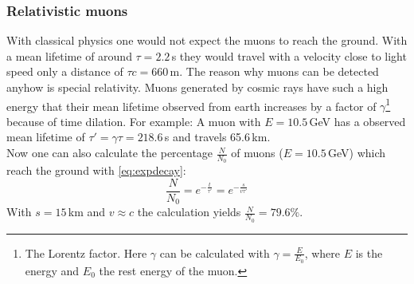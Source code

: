 \subsubsection{Relativistic muons}
With classical physics one would not expect the muons to reach the ground. With a mean lifetime of around $\tau=2.2$\,\textmu s they would 
travel with a velocity close to light speed only a distance of  $\tau c = 660$\,m. The reason why muons can be detected anyhow is special relativity. Muons generated 
by cosmic rays have such a high energy that their mean lifetime observed from earth increases by a factor of 
$\gamma$\footnote{The Lorentz factor. Here $\gamma$ can be calculated with $\gamma = \frac{E}{E_0}$, where $E$ is the energy and $E_0$ the rest energy of the muon.} 
because of time dilation. For example: A muon with $E=10.5$\,GeV has a observed mean lifetime of $\tau'=\gamma \tau=218.6$\,\textmu s and travels 65.6\,km. \\
Now one can also calculate the percentage $\frac{N}{N_0}$ of muons ($E=10.5$\,GeV) which reach the ground with \autoref{eq:expdecay}:
\begin{equation}
    \frac{N}{N_0} = e^{-\frac{t}{\tau'}} = e^{-\frac{s}{v\tau'}}
\end{equation}
With $s=15$\,km and $v \approx c$ the calculation yields $\frac{N}{N_0} = 79.6\%$.
